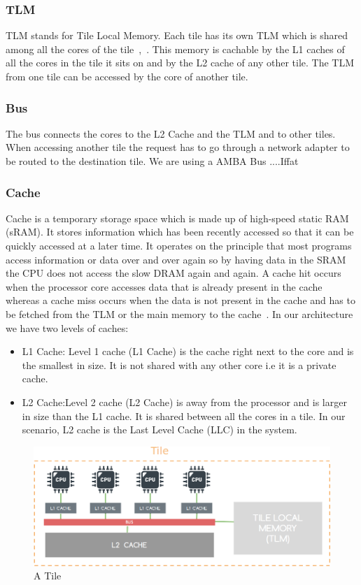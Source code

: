 \documentclass{listhesis}
\begin{document}
\subsubsection{TLM}
TLM stands for Tile Local Memory. Each tile has its own TLM which is shared among all the cores of the tile~\cite{ankitThesis},~\cite{iNetworkAdapter}. This memory is cachable by the L1 caches of all the cores in the tile it sits on and by the L2 cache of any other tile. The TLM from one tile can be accessed by the core of another tile.\\
\subsubsection{Bus}
The bus connects the cores to the L2 Cache and the TLM and to other tiles. When accessing another tile the request has to go through a network adapter to be routed to the destination tile. We are using a AMBA Bus ....Iffat  
\subsubsection{Cache}
Cache is a temporary storage space which is made up of high-speed static RAM (sRAM). It stores information which has been recently accessed so that it can be quickly accessed at a later time. It operates on the principle that most programs access information or data over and over again so by having data in the SRAM the CPU does not access the slow DRAM again and again. A cache hit occurs when the processor core accesses data that is already present in the cache whereas a cache miss occurs when the data is not present in the cache and has to be fetched from the TLM or the main memory to the cache~\cite{iffatseminarpaper}. In our architecture we have two levels of caches:
\begin{itemize}
  \item L1 Cache: Level 1 cache (L1 Cache) is the cache right next to the core and is the smallest in size. It is not shared with any other core i.e it is a private cache.
  \item L2 Cache:Level 2 cache (L2 Cache) is away from the processor and is larger in size than the L1 cache. It is shared between all the cores in a tile. In our scenario, L2 cache is the Last Level Cache (LLC) in the system.
\end{itemize}
\begin{figure}
  \includegraphics[width=\linewidth]{tile.png}
  \centering
  \caption{A Tile}
  \label{fig:tile}
\end{figure}
\end{document}

